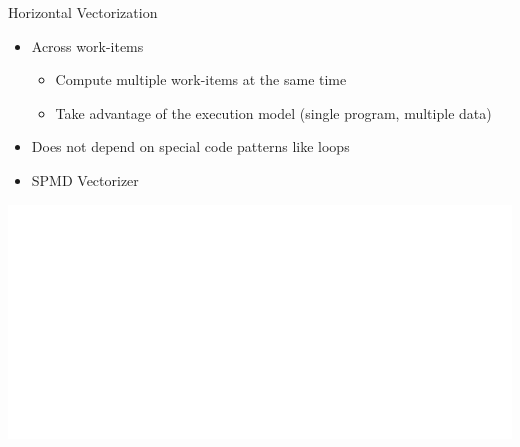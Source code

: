 
\begin{frame}{Horizontal Vectorization}

\begin{itemize}
    \item Across work-items
    \begin{itemize}
        \item Compute multiple work-items at the same time
        \item Take advantage of the execution model (single program, multiple data)
    \end{itemize}
    \item Does not depend on special code patterns like loops
    \item SPMD Vectorizer
\end{itemize}

\vspace{3ex}
\hspace{0.55em}\includegraphics[scale=0.40]{images/horizontal-vectorization.pdf}

\end{frame}


